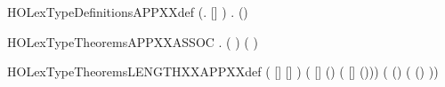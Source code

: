 \newcommand{\HOLexTypeDate}{26 October 2017}
\newcommand{\HOLexTypeTime}{16:40}
\begin{SaveVerbatim}{HOLexTypeDefinitionsAPPXXdef}
\HOLTokenTurnstile{} (\HOLSymConst{\HOLTokenForall{}}.  []  \HOLSymConst{=} ) \HOLSymConst{\HOLTokenConj{}} \HOLSymConst{\HOLTokenForall{}}  .  (\HOLSymConst{::})  \HOLSymConst{=} \HOLSymConst{::}  
\end{SaveVerbatim}
\newcommand{\HOLexTypeDefinitionsAPPXXdef}{\UseVerbatim{HOLexTypeDefinitionsAPPXXdef}}
\newcommand{\HOLexTypeDefinitions}{
\HOLDfnTag{exType}{APP_def}\HOLexTypeDefinitionsAPPXXdef
}
\begin{SaveVerbatim}{HOLexTypeTheoremsAPPXXASSOC}
\HOLTokenTurnstile{} \HOLSymConst{\HOLTokenForall{}}  .  (  )  \HOLSymConst{=}   (  )
\end{SaveVerbatim}
\newcommand{\HOLexTypeTheoremsAPPXXASSOC}{\UseVerbatim{HOLexTypeTheoremsAPPXXASSOC}}
\begin{SaveVerbatim}{HOLexTypeTheoremsLENGTHXXAPPXXdef}
\HOLTokenTurnstile{} ( [] [] \HOLSymConst{=} ) \HOLSymConst{\HOLTokenConj{}}
   ( [] (\HOLSymConst{::}) \HOLSymConst{=}  ( [] (\HOLSymConst{::}))) \HOLSymConst{\HOLTokenConj{}}
   ( (\HOLSymConst{::})  \HOLSymConst{=}  ( (\HOLSymConst{::}) ))
\end{SaveVerbatim}
\newcommand{\HOLexTypeTheoremsLENGTHXXAPPXXdef}{\UseVerbatim{HOLexTypeTheoremsLENGTHXXAPPXXdef}}
